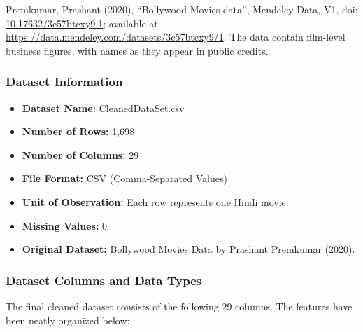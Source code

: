 \documentclass[a4paper, 11pt]{article}
\begin{document}
Premkumar, Prashant (2020), ``Bollywood Movies data'', Mendeley Data, V1, 
doi: \href{https://doi.org/10.17632/3c57btcxy9.1}{10.17632/3c57btcxy9.1}; 
available at \url{https://data.mendeley.com/datasets/3c57btcxy9/1}. 
The data contain film-level business figures, with names as they appear in public credits.

\subsubsection*{Dataset Information}

\begin{itemize}
    \item \textbf{Dataset Name:} CleanedDataSet.csv
    \item \textbf{Number of Rows:} 1,698
    \item \textbf{Number of Columns:} 29
    \item \textbf{File Format:} CSV (Comma-Separated Values)
    \item \textbf{Unit of Observation:} Each row represents one Hindi movie.
    \item \textbf{Missing Values:} 0
    \item \textbf{Original Dataset:} Bollywood Movies Data by Prashant Premkumar (2020).
    
\end{itemize}

\subsubsection*{Dataset Columns and Data Types}

The final cleaned dataset consists of the following 29 columns. The features have been neatly organized below:
\end{document}
